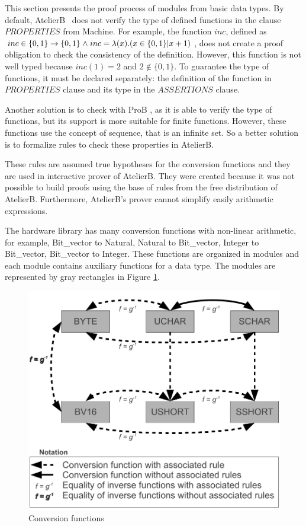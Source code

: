 

This section presents the proof process of modules from basic data types.
By default, AtelierB~\cite{atelierB} does not verify the type of defined functions in the clause $PROPERTIES$ from Machine. For example, the function $inc$, defined as $inc \in \{0,1\} \fun \{0,1\} \land inc = \lambda(x).( x \in \{0,1\} | x + 1)$, does not create a proof obligation to check the consistency of the definition. However, this function is not well typed because $inc(1)=2$ and $ 2 \not\in \{0,1\}$. To guarantee the type of functions, it must be declared separately: the definition of the function in $PROPERTIES$ clause and its type in the $ASSERTIONS$ clause.

Another solution is to check with ProB \cite{proB}, as it is able to verify the type of functions, but its support is more suitable for finite functions. However, these functions use the concept of sequence, that is an infinite set. So a better solution is to formalize rules to check these properties in AtelierB.

These rules are assumed true hypotheses for the conversion functions and they are used in interactive prover of AtelierB. They were created because it was not possible to build proofs using the base of rules from the free distribution of AtelierB. Furthermore, AtelierB's prover cannot simplify easily arithmetic expressions.

The hardware library has many conversion functions with non-linear arithmetic, for example, Bit\_vector to Natural, Natural to Bit\_vector, Integer to Bit\_vector, Bit\_vector to Integer. These functions are organized in modules and each module contains auxiliary functions for a data type. The modules are represented by gray rectangles in Figure \ref{DiagramTypesRules}. %

\begin{figure}[he]
\centering
\includegraphics[width=3.in]{images/Diagram_Types_and_Rules.pdf}
\caption{Conversion functions}
\label{DiagramTypesRules}
\end{figure}


